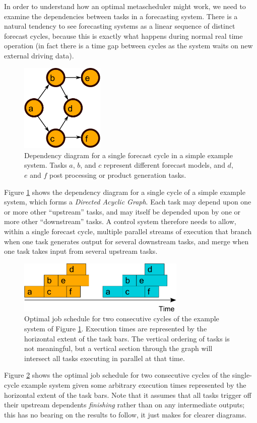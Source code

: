 \documentclass[11pt,a4paper]{article}
\begin{document}
In order to understand how an optimal metascheduler might work, we need
to examine the dependencies between tasks in a forecasting system. There
is a natural tendency to see forecasting systems as a linear sequence of
distinct forecast cycles, because this is exactly what happens during
normal real time operation (in fact there is a time gap between cycles
as the system waits on new external driving data). 
\begin{figure}
    \begin{center}
        \includegraphics[width=4cm]{dependencies-one}
    \end{center}
    \caption{\small Dependency diagram for a single forecast cycle
    in a simple example system. Tasks $a$, $b$, and $c$ represent
    different forecast models, and $d$, $e$ and $f$ post processing or
    product generation tasks.}
    \label{fig-dep-one}
\end{figure}
Figure \ref{fig-dep-one} shows the dependency diagram for a single
cycle of a simple example system, which forms a {\em Directed Acyclic
Graph}.  Each task may depend upon one or more other ``upstream'' tasks,
and may itself be depended upon by one or more other ``downstream''
tasks.  A control system therefore needs to allow, within a single
forecast cycle, multiple parallel streams of execution that branch when
one task generates output for several downstream tasks, and merge when
one task takes input from several upstream tasks. 
\begin{figure}
    \begin{center}
        \includegraphics[width=8cm]{timeline-one}
    \end{center}
    \caption{\small Optimal job schedule for two consecutive cycles of
    the example system of Figure \ref{fig-dep-one}.  Execution times
    are represented by the horizontal extent of the task bars. The
    vertical ordering of tasks is not meaningful, but a vertical section
    through the graph will intersect all tasks executing in parallel at
    that time.}
    \label{fig-time-one}
\end{figure}
Figure \ref{fig-time-one} shows the optimal job schedule for two
consecutive cycles of the single-cycle example system given some
arbitrary execution times represented by
the horizontal extent of the task bars. Note that it assumes that all
tasks trigger off their upstream dependents {\em finishing} rather than
on any intermediate outputs; this has no bearing on the results to
follow, it just makes for clearer diagrams.  
\end{document}
